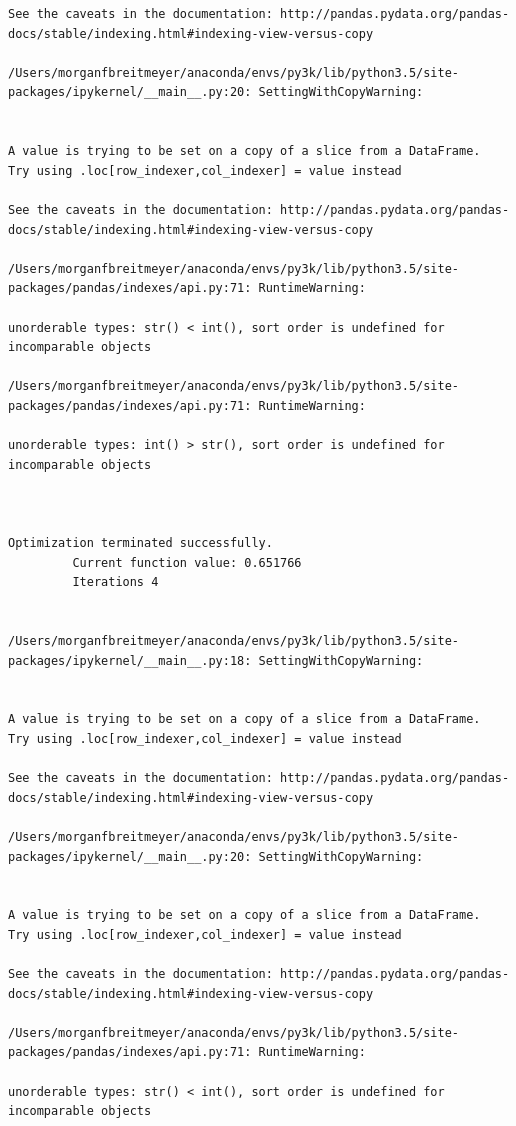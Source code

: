 \begin{lstlisting}
See the caveats in the documentation: http://pandas.pydata.org/pandas-docs/stable/indexing.html#indexing-view-versus-copy

/Users/morganfbreitmeyer/anaconda/envs/py3k/lib/python3.5/site-packages/ipykernel/__main__.py:20: SettingWithCopyWarning:


A value is trying to be set on a copy of a slice from a DataFrame.
Try using .loc[row_indexer,col_indexer] = value instead

See the caveats in the documentation: http://pandas.pydata.org/pandas-docs/stable/indexing.html#indexing-view-versus-copy

/Users/morganfbreitmeyer/anaconda/envs/py3k/lib/python3.5/site-packages/pandas/indexes/api.py:71: RuntimeWarning:

unorderable types: str() < int(), sort order is undefined for incomparable objects

/Users/morganfbreitmeyer/anaconda/envs/py3k/lib/python3.5/site-packages/pandas/indexes/api.py:71: RuntimeWarning:

unorderable types: int() > str(), sort order is undefined for incomparable objects



Optimization terminated successfully.
         Current function value: 0.651766
         Iterations 4


/Users/morganfbreitmeyer/anaconda/envs/py3k/lib/python3.5/site-packages/ipykernel/__main__.py:18: SettingWithCopyWarning:


A value is trying to be set on a copy of a slice from a DataFrame.
Try using .loc[row_indexer,col_indexer] = value instead

See the caveats in the documentation: http://pandas.pydata.org/pandas-docs/stable/indexing.html#indexing-view-versus-copy

/Users/morganfbreitmeyer/anaconda/envs/py3k/lib/python3.5/site-packages/ipykernel/__main__.py:20: SettingWithCopyWarning:


A value is trying to be set on a copy of a slice from a DataFrame.
Try using .loc[row_indexer,col_indexer] = value instead

See the caveats in the documentation: http://pandas.pydata.org/pandas-docs/stable/indexing.html#indexing-view-versus-copy

/Users/morganfbreitmeyer/anaconda/envs/py3k/lib/python3.5/site-packages/pandas/indexes/api.py:71: RuntimeWarning:

unorderable types: str() < int(), sort order is undefined for incomparable objects


\end{lstlisting}
